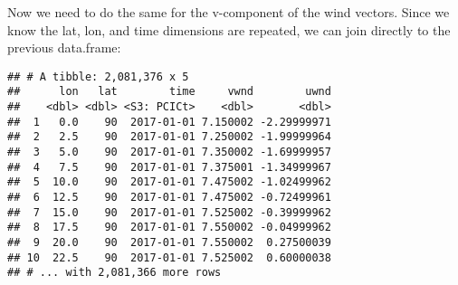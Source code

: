 \documentclass[]{book}
\newenvironment{Shaded}{\begin{snugshade}}{\end{snugshade}}
\newcommand{\KeywordTok}[1]{\textcolor[rgb]{0.13,0.29,0.53}{\textbf{{#1}}}}
\newcommand{\DataTypeTok}[1]{\textcolor[rgb]{0.13,0.29,0.53}{{#1}}}
\newcommand{\StringTok}[1]{\textcolor[rgb]{0.31,0.60,0.02}{{#1}}}
\newcommand{\OtherTok}[1]{\textcolor[rgb]{0.56,0.35,0.01}{{#1}}}
\newcommand{\NormalTok}[1]{{#1}}
\theoremstyle{definition}
\theoremstyle{definition}
\theoremstyle{remark}
\begin{document}
Now we need to do the same for the v-component of the wind vectors.
Since we know the lat, lon, and time dimensions are repeated, we can
join directly to the previous data.frame:

\begin{Shaded}
\end{Shaded}

\begin{verbatim}
## # A tibble: 2,081,376 x 5
##      lon   lat        time     vwnd        uwnd
##    <dbl> <dbl> <S3: PCICt>    <dbl>       <dbl>
##  1   0.0    90  2017-01-01 7.150002 -2.29999971
##  2   2.5    90  2017-01-01 7.250002 -1.99999964
##  3   5.0    90  2017-01-01 7.350002 -1.69999957
##  4   7.5    90  2017-01-01 7.375001 -1.34999967
##  5  10.0    90  2017-01-01 7.475002 -1.02499962
##  6  12.5    90  2017-01-01 7.475002 -0.72499961
##  7  15.0    90  2017-01-01 7.525002 -0.39999962
##  8  17.5    90  2017-01-01 7.550002 -0.04999962
##  9  20.0    90  2017-01-01 7.550002  0.27500039
## 10  22.5    90  2017-01-01 7.525002  0.60000038
## # ... with 2,081,366 more rows
\end{verbatim}
\end{document}
